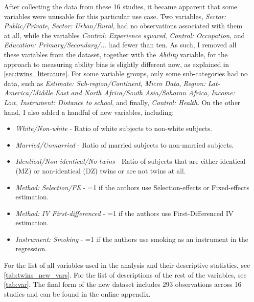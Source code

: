 After collecting the data from these 16 studies, it became apparent that some variables were unusable for this particular use case. Two variables, \textit{Sector: Public/Private}, \textit{Sector: Urban/Rural}, had no observations associated with them at all, while the variables \textit{Control: Experience squared}, \textit{Control: Occupation}, and \textit{Education: Primary/Secondary/...} had fewer than ten. As such, I removed all these variables from the dataset, together with the \textit{Ability} variable, for the approach to measuring ability bias is slightly different now, as explained in \autoref{sec:twins_literature}. For some variable groups, only some sub-categories had no data, such as \textit{Estimate: Sub-region/Continent}, \textit{Micro Data}, \textit{Region: Lat-America/Middle East and North Africa/South Asia/Saharan Africa}, \textit{Income: Low}, \textit{Instrument: Distance to school}, and finally, \textit{Control: Health}. On the other hand, I also added a handful of new variables, including:

\begin{itemize}
  \item \textit{White/Non-white} - Ratio of white subjects to non-white subjects.
  \item \textit{Married/Unmarried} - Ratio of married subjects to non-married subjects.
  \item \textit{Identical/Non-identical/No twins} - Ratio of subjects that are either identical (MZ) or non-identical (DZ) twins or are not twins at all.
  \item \textit{Method: Selection/FE} - =1 if the authors use  Selection-effects or Fixed-effects estimation.
  \item \textit{Method: IV First-differenced} - =1 if the authors use First-Differenced IV estimation.
  \item \textit{Instrument: Smoking} - =1 if the authors use smoking as an instrument in the regression.
\end{itemize}

For the list of all variables used in the analysis and their descriptive statistics, see \autoref{tab:twins_new_vars}. For the list of descriptions of the rest of the variables, see \autoref{tab:var}. The final form of the new dataset includes 293 observations across 16 studies and can be found in the online appendix.


